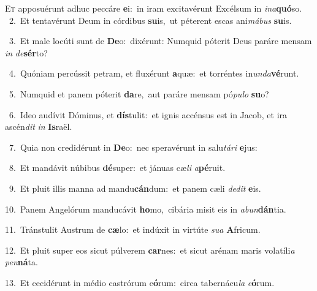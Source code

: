 \lettrine{\initial\textcolor{\initialcolor}{E}}{t} apposuérunt adhuc peccáre \textbf{e}\-i:~\star in iram excitavérunt Excélsum in \textit{in}\-\textit{a}\textbf{quó}so.\\
{\numbfont\textcolor{\numbcolor}{~2.}}~Et tentavérunt Deum in córdibus \textbf{su}\-is,~\star ut péterent escas ani\-\textit{má}\-\textit{bus} \textbf{su}\-is.\par
{\numbfont\textcolor{\numbcolor}{~3.}}~Et male locúti sunt de \textbf{De}\-o:~\star dixérunt: Numquid póterit Deus paráre mensam \textit{in} \textit{de}\-\textbf{sér}to?\par
{\numbfont\textcolor{\numbcolor}{~4.}}~Quóniam percússit petram, et fluxérunt \textbf{a}\-quæ:~\star et torréntes in\-\textit{un}\-\textit{da}\textbf{vé}runt.\par
{\numbfont\textcolor{\numbcolor}{~5.}}~Numquid et panem póterit \textbf{da}\-re,~\star aut paráre mensam pó\-\textit{pu}\-\textit{lo} \textbf{su}\-o?\par
{\numbfont\textcolor{\numbcolor}{~6.}}~Ideo audívit Dóminus, et \textbf{dís}\-tulit:~\star et ignis accénsus est in Jacob, et ira ascén\textit{dit} \textit{in} \textbf{Is}\-raël.\par
{\numbfont\textcolor{\numbcolor}{~7.}}~Quia non credidérunt in \textbf{De}\-o:~\star nec speravérunt in salu\-\textit{tá}\-\textit{ri} \textbf{e}\-jus:\par
{\numbfont\textcolor{\numbcolor}{~8.}}~Et mandávit núbibus \textbf{dé}\-super:~\star et jánuas cæ\textit{li} \textit{a}\-\textbf{pé}ruit.\par
{\numbfont\textcolor{\numbcolor}{~9.}}~Et pluit illis manna ad mandu\-\textbf{cán}\-dum:~\star et panem cæli \textit{de}\-\textit{dit} \textbf{e}\-is.\par
{\numbfont\textcolor{\numbcolor}{10.}}~Panem Angelórum manducávit \textbf{ho}\-mo,~\star cibária misit eis in \textit{ab}\-\textit{un}\textbf{dán}tia.\par
{\numbfont\textcolor{\numbcolor}{11.}}~Tránstulit Austrum de \textbf{cæ}\-lo:~\star et indúxit in virtúte \textit{su}\-\textit{a} \textbf{A}\-fricum.\par
{\numbfont\textcolor{\numbcolor}{12.}}~Et pluit super eos sicut púlverem \textbf{car}\-nes:~\star et sicut arénam maris volatíli\textit{a} \textit{pen}\-\textbf{ná}ta.\par
{\numbfont\textcolor{\numbcolor}{13.}}~Et cecidérunt in médio castrórum e\-\textbf{ó}\-rum:~\star circa tabernácu\textit{la} \textit{e}\-\textbf{ó}rum.\par
